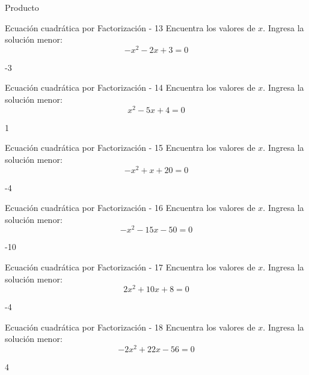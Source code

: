 \documentclass[a4,11pt]{aleph-notas}
\begin{document}
\begin{quiz}{Producto}
\begin{numerical}[]%
    {Ecuación cuadrática por Factorización - 13}
    Encuentra los valores de $x$. Ingresa la solución menor:
    \[
        - x^{2} - 2 x + 3 = 0
    \]
    \item[] -3
\end{numerical}

\begin{numerical}[]%
    {Ecuación cuadrática por Factorización - 14}
    Encuentra los valores de $x$. Ingresa la solución menor:
    \[
        x^{2} - 5 x + 4 = 0
    \]
    \item[] 1
\end{numerical}

\begin{numerical}[]%
    {Ecuación cuadrática por Factorización - 15}
    Encuentra los valores de $x$. Ingresa la solución menor:
    \[
        - x^{2} + x + 20 = 0
    \]
    \item[] -4
\end{numerical}

\begin{numerical}[]%
    {Ecuación cuadrática por Factorización - 16}
    Encuentra los valores de $x$. Ingresa la solución menor:
    \[
        - x^{2} - 15 x - 50 = 0
    \]
    \item[] -10
\end{numerical}

\begin{numerical}[]%
    {Ecuación cuadrática por Factorización - 17}
    Encuentra los valores de $x$. Ingresa la solución menor:
    \[
        2 x^{2} + 10 x + 8 = 0
    \]
    \item[] -4
\end{numerical}

\begin{numerical}[]%
    {Ecuación cuadrática por Factorización - 18}
    Encuentra los valores de $x$. Ingresa la solución menor:
    \[
        - 2 x^{2} + 22 x - 56 = 0
    \]
    \item[] 4
\end{numerical}


\end{quiz}
\end{document}
